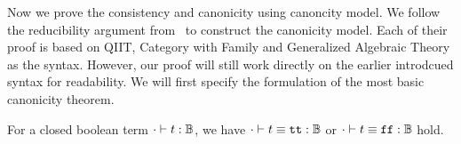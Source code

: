 Now we prove the consistency and canonicity using canoncity model. We follow the reducibility argument from~\cite{kaposi2019gluing, coquand2018canonicity,sterling2019algebraic} to construct the canonicity model.
Each of their proof is based on QIIT, Category with Family\cite{dybjer1995internal} and Generalized Algebraic Theory \cite{cartmell1986generalised} as the syntax. However, our proof will still work directly on the earlier introdcued syntax for readability.
We will first specify the formulation of the most basic canonicity theorem. 

\begin{theorem}[Canonicity]
  For a closed boolean term $ {\cdot} \vdash {t} : {\mathbb{B}} $, we have $ {\cdot} \vdash {t \equiv \ensuremath{\texttt{tt}}} : {\mathbb{B}} $ or $ {\cdot} \vdash {t \equiv \ensuremath{\texttt{ff}}} : {\mathbb{B}} $ hold.
\end{theorem}

